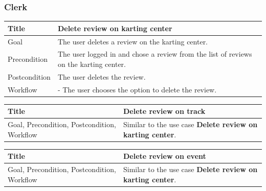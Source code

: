 \documentclass{beamer}
\begin{document}
\begin{frame}
    \frametitle{Clerk}
    \begin{table}
        \tiny
        \begin{tabular}{|p{2cm}|p{6cm}|}
        \hline  
        Title & \textbf{Delete review on karting center} \\
        \hline
        Goal & The user deletes a review on the karting center. \\
        \hline
        Precondition & The user logged in and chose a review from the list of reviews on the karting center. \\
        \hline
        Postcondition & The user deletes the review. \\
        \hline
        Workflow &
        - The user chooses the option to delete the review. \\
        \hline
        \end{tabular}
    \end{table}

    \begin{table}
        \tiny
        \begin{tabular}{|p{2cm}|p{6cm}|}
        \hline  
        Title & \textbf{Delete review on track} \\
        \hline
        Goal, Precondition, Postcondition, Workflow & Similar 
        to the use case \textbf{Delete review on karting center}. \\
        \hline
        \end{tabular}
    \end{table}

    \begin{table}
        \tiny
        \begin{tabular}{|p{2cm}|p{6cm}|}
        \hline  
        Title & \textbf{Delete review on event} \\
        \hline
        Goal, Precondition, Postcondition, Workflow & Similar 
        to the use case \textbf{Delete review on karting center}. \\
        \hline
        \end{tabular}
    \end{table}

\end{frame}

\end{document}
